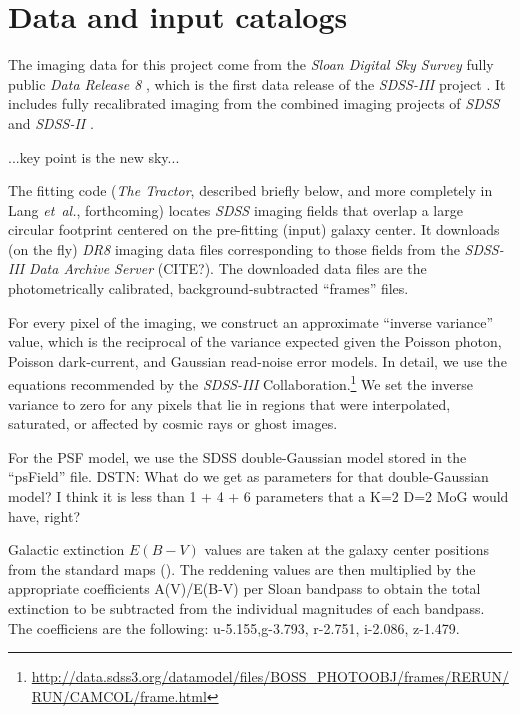 \documentclass[12pt,preprint,pdftex]{aastex}
\newcommand{\foreign}[1]{\emph{#1}}
\newcommand{\etal}{\foreign{et~al.}}
\newcommand{\project}[1]{\textsl{#1}}
\begin{document}
\section{Data and input catalogs}\label{sec:data}

The imaging data for this project come from the \project{Sloan Digital
  Sky Survey} fully public \project{Data Release 8} \citep{dr8}, which is
the first data release of the \project{SDSS-III} project \citep{sdssiii}.  It
includes fully recalibrated imaging \citep{padmanabhan} from the
combined imaging projects of \project{SDSS} \citep{york}  and
\project{SDSS-II} \citep{sdssii}.

...key point is the new sky...

The fitting code (\project{The Tractor}, described briefly below, and
more completely in Lang \etal, forthcoming) locates \project{SDSS}
imaging fields that overlap a large circular footprint centered on the
pre-fitting (input) galaxy center.  It downloads (on the fly)
\project{DR8} imaging data files corresponding to those fields from
the \project{SDSS-III} \project{Data Archive Server} (CITE?).  The
downloaded data files are the photometrically calibrated,
background-subtracted ``frames'' files.

For every pixel of the imaging, we construct an approximate ``inverse
variance'' value, which is the reciprocal of the variance expected
given the Poisson photon, Poisson dark-current, and Gaussian
read-noise error models.  In detail, we use the equations recommended
by the \project{SDSS-III}
Collaboration.\footnote{\url{http://data.sdss3.org/datamodel/files/BOSS\_PHOTOOBJ/frames/RERUN/RUN/CAMCOL/frame.html}}
We set the inverse variance to zero for any pixels that lie in regions
that were interpolated, saturated, or affected by cosmic rays or ghost
images.

For the PSF model, we use the SDSS double-Gaussian model stored in the
``psField'' file.  DSTN: What do we get as parameters for that
double-Gaussian model?  I think it is less than 1 + 4 + 6 parameters
that a K=2 D=2 MoG would have, right?

Galactic extinction $E(B-V)$ values are taken at the galaxy center
positions from the standard maps (\citealt{schlegel98}).  The
reddening values are then multiplied by the appropriate coefficients
A(V)/E(B-V) per Sloan bandpass to obtain the total extinction to be
subtracted from the individual magnitudes of each bandpass. The
coefficiens are the following: u-5.155,g-3.793, r-2.751, i-2.086,
z-1.479.
\end{document}
